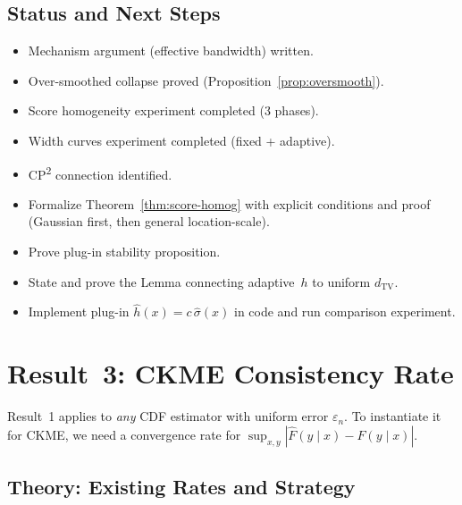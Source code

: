 \documentclass[11pt]{article}
\begin{document}
\subsection{Status and Next Steps}

\begin{itemize}
  \item[$\checkmark$] Mechanism argument (effective bandwidth) written.
  \item[$\checkmark$] Over-smoothed collapse proved
    (Proposition~\ref{prop:oversmooth}).
  \item[$\checkmark$] Score homogeneity experiment completed (3 phases).
  \item[$\checkmark$] Width curves experiment completed (fixed +
    adaptive).
  \item[$\checkmark$] CP\textsuperscript{2} connection identified.
  \item[$\square$] Formalize Theorem~\ref{thm:score-homog} with
    explicit conditions and proof (Gaussian first, then general
    location-scale).
  \item[$\square$] Prove plug-in stability proposition.
  \item[$\square$] State and prove the Lemma connecting adaptive~$h$
    to uniform $d_{\mathrm{TV}}$.
  \item[$\square$] Implement plug-in $\hat h(x) = c\,\hat\sigma(x)$
    in code and run comparison experiment.
\end{itemize}


\section{Result~3: CKME Consistency Rate}
\label{sec:result3}

Result~1 applies to \emph{any} CDF estimator with uniform error
$\varepsilon_n$. To instantiate it for CKME, we need a convergence
rate for $\sup_{x,y}|\hat F(y\mid x) - F(y\mid x)|$.

\subsection{Theory: Existing Rates and Strategy}
\end{document}
